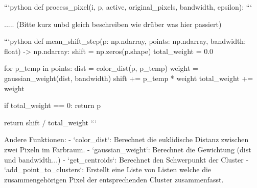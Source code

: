 ```python
def process_pixel(i, p, active, original_pixels, bandwidth, epsilon):
```


.....
(Bitte kurz unbd gleich beschreiben wie drüber was hier passiert)

```python
def mean_shift_step(p: np.ndarray, points: np.ndarray, bandwidth: float) -> np.ndarray:
    shift = np.zeros(p.shape)
        total_weight = 0.0

        for p_temp in points:
            dist = color_dist(p, p_temp)
            weight = gaussian_weight(dist, bandwidth)
            shift += p_temp * weight
            total_weight += weight

        if total_weight == 0:
            return p

        return shift / total_weight
```


Andere Funktionen:
- `color_dist`: Berechnet die euklidische Distanz zwischen zwei Pixeln im Farbraum.
- `gaussian_weight`: Berechnet die Gewichtung (dist und bandwidth...)
- `get_centroids`: Berechnet den Schwerpunkt der Cluster
- `add_point_to_clusters`: Erstellt eine Liste von Listen welche die zusammengehörigen Pixel der entsprechenden Cluster zusammenfasst.



\newpage